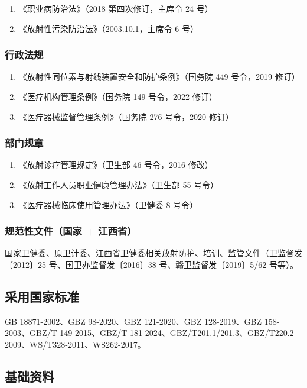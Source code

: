 \begin{enumerate}
\item 《职业病防治法》（2018 第四次修订，主席令 24 号）
\item 《放射性污染防治法》（2003.10.1，主席令 6 号）
\end{enumerate}

\subsubsection{行政法规}

\begin{enumerate}
\item 《放射性同位素与射线装置安全和防护条例》（国务院 449 号令，2019 修订）
\item 《医疗机构管理条例》（国务院 149 号令，2022 修订）
\item 《医疗器械监督管理条例》（国务院 276 号令，2020 修订）
\end{enumerate}

\subsubsection{部门规章}

\begin{enumerate}
\item 《放射诊疗管理规定》（卫生部 46 号令，2016 修改）
\item 《放射工作人员职业健康管理办法》（卫生部 55 号令）
\item 《医疗器械临床使用管理办法》（卫健委 8 号令）
\end{enumerate}

\subsubsection{规范性文件（国家 + 江西省）}

国家卫健委、原卫计委、江西省卫健委相关放射防护、培训、监管文件（卫监督发〔2012〕25 号、国卫办监督发〔2016〕38 号、赣卫监督发〔2019〕5/62 号等）。

\subsection{采用国家标准}

GB 18871-2002、GBZ 98-2020、GBZ 121-2020、GBZ 128-2019、GBZ 158-2003、GBZ/T 149-2015、GBZ/T 181-2024、GBZ/T201.1/201.3、GBZ/T220.2-2009、WS/T328-2011、WS262-2017。

\subsection{基础资料}

